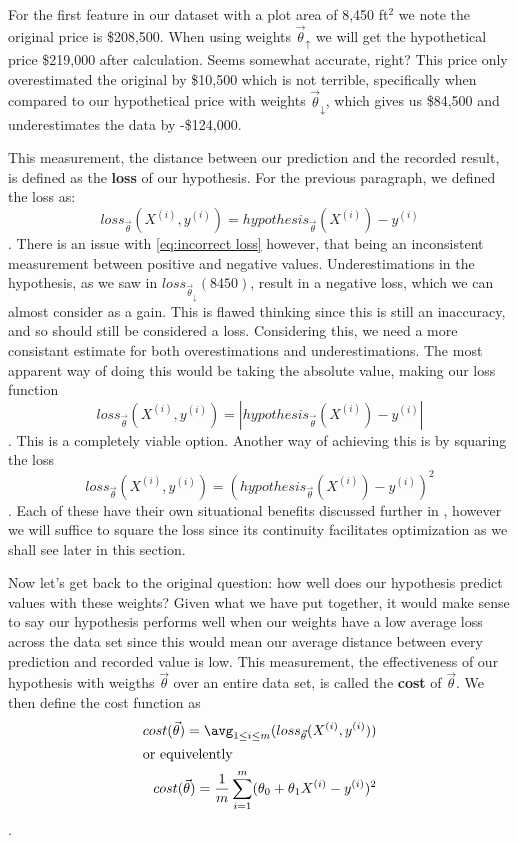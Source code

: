 For the first feature in our dataset with a plot area of 8,450 ft$^2$ we note the original price is \$208,500. When using weights $\vec\theta_{\uparrow}$ we will get the hypothetical price \$219,000 after calculation. Seems somewhat accurate, right? This price only overestimated the original by \$10,500 which is not terrible, specifically when compared to our hypothetical price  with weights $\vec\theta_{\downarrow}$, which gives us \$84,500 and underestimates the data by -\$124,000.

This measurement, the distance between our prediction and the recorded result,
is defined as the \textbf{loss} of our hypothesis. For the previous paragraph, we defined the loss as:
\begin{equation}\label{eq:incorrect loss}
	loss_{\vec\theta}(X^{(i)}, y^{(i)}) = hypothesis_{\vec\theta}(X^{(i)})-y^{(i)}
\end{equation}
. There is an issue with \ref{eq:incorrect loss} however, that being an inconsistent measurement between positive and negative values. Underestimations in the hypothesis, as we saw in $loss_{\vec\theta_{\downarrow}}(8450)$, result in a negative loss, which we can almost consider as a gain. This is flawed thinking since this is still an inaccuracy, and so should still be considered a loss. Considering this, we need a more consistant estimate for both overestimations and underestimations. The most apparent way of doing this would be taking the absolute value, making our loss function
\begin{equation}
	loss_{\vec\theta}(X^{(i)}, y^{(i)}) = |hypothesis_{\vec\theta}(X^{(i)}) - y^{(i)}|
\end{equation}
. This is a completely viable option. Another way of achieving this is by
squaring the loss
\begin{equation}
	loss_{\vec\theta}(X^{(i)}, y^{(i)}) = (hypothesis_{\vec\theta}(X^{(i)}) - y^{(i)})^2
\end{equation}
. Each of these have their own situational benefits discussed further in
\placeholder, however we will suffice to square the loss since its continuity
facilitates optimization as we shall see later in this section.

Now let's get back to the original question: how well does our hypothesis
predict values with these weights? Given what we have put together, it would
make sense to say our hypothesis performs well when our weights have a low
average loss across the data set since this would mean our average distance
between every prediction and recorded value is low. This measurement, the
effectiveness of our hypothesis with weigths $\vec\theta$ over an entire data set, is
called the \textbf{cost} of $\vec\theta$. We then define the cost function as
\begin{subequations}
    \begin{align}
        cost(\vec\theta) = \avg_{1\leq i\leq m} (loss_{\vec\theta}(X^{(i)}, y^{(i)})) \\
    \intertext{or equivelently}
        cost(\vec\theta) = \frac{1}{m}\sum_{i=1}^m (\theta_0 + \theta_1X^{(i)} -
        y^{(i)})^2
    \end{align}
\end{subequations}
.

